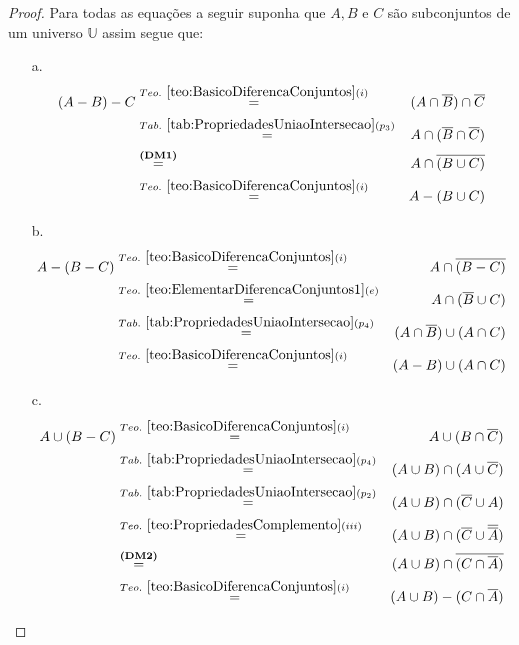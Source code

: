 \begin{proof}
  Para todas as equações a seguir suponha que $A, B$ e $C$ são subconjuntos de um universo $\mathbb{U}$ assim segue que:
  \begin{itemize}
		\item[a.]
		\begin{eqnarray*}
			(A - B) - C & \stackrel{Teo. \  \ref{teo:BasicoDiferencaConjuntos}(i)}{=} & (A \cap \overline{B}) \cap \overline{C}\\
			& \stackrel{Tab. \ \ref{tab:PropriedadesUniaoIntersecao}(p_3)}{=} & A \cap (\overline{B} \cap \overline{C})\\
			& \stackrel{\textbf{(DM1)}}{=} & A \cap \overline{(B \cup C)}\\
			& \stackrel{Teo. \  \ref{teo:BasicoDiferencaConjuntos}(i)}{=} & A - (B \cup C)
		\end{eqnarray*}
		\item[b.]
		\begin{eqnarray*}
			A - (B - C) & \stackrel{Teo. \  \ref{teo:BasicoDiferencaConjuntos}(i)}{=} & A \cap \overline{(B - C)} \\
			& \stackrel{Teo. \ \ref{teo:ElementarDiferencaConjuntos1}(e)}{=} & A \cap (\overline{B} \cup C)\\
			& \stackrel{Tab. \ \ref{tab:PropriedadesUniaoIntersecao}(p_4)}{=} & (A \cap \overline{B}) \cup (A \cap C)\\
			& \stackrel{Teo. \  \ref{teo:BasicoDiferencaConjuntos}(i)}{=} & (A - B) \cup (A \cap C)
		\end{eqnarray*}
		\item[c.]
		\begin{eqnarray*}
			A \cup (B - C) & \stackrel{Teo. \  \ref{teo:BasicoDiferencaConjuntos}(i)}{=} & A \cup (B \cap \overline{C})\\
			& \stackrel{Tab. \ \ref{tab:PropriedadesUniaoIntersecao}(p_4)}{=} &  (A \cup B) \cap (A \cup \overline{C})\\
			& \stackrel{Tab. \ \ref{tab:PropriedadesUniaoIntersecao}(p_2)}{=} & (A \cup B) \cap (\overline{C} \cup A)\\
			& \stackrel{Teo. \ \ref{teo:PropriedadesComplemento}(iii)}{=}& (A \cup B) \cap (\overline{C} \cup \overline{\overline{A}})\\
			& \stackrel{\textbf{(DM2)}}{=}& (A \cup B) \cap \overline{(C \cap \overline{A})}\\
			& \stackrel{Teo. \  \ref{teo:BasicoDiferencaConjuntos}(i)}{=}& (A \cup B) - (C \cap \overline{A})\\

\end{eqnarray*}
\end{itemize}
\end{proof}
